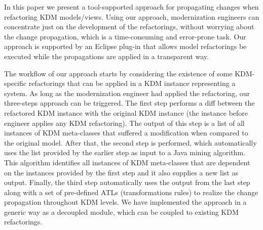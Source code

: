 In this paper we present a tool-supported approach for propagating changes when refactoring KDM models/views. Using our approach, modernization engineers can concentrate just on the development of the refactorings, without worrying about the change propagation, which is a time-consuming and error-prone task. Our approach is supported by an Eclipse plug-in that allows model refactorings be executed while the propagations are applied in a transparent way.


The workflow of our approach starts by considering the existence of some KDM-specific refactorings that can be applied in a KDM instance representing a system. As long as the modernization engineer had applied the refactoring, our three-steps approach can be triggered. The first step performs a diff between the refactored KDM instance with the original KDM instance (the instance before engineer applies any KDM refactoring). The output of this step is a list of all instances of KDM meta-classes that suffered a modification when compared to the original model. After that, the second step is performed, which automatically uses the list provided by the earlier step as input to a Java mining algorithm. This algorithm identifies all instances of KDM meta-classes that are dependent on the instances provided by the first step and it also supplies a new list as output.
%
%
%
Finally, the third step automatically uses the output from the last step along with a set of pre-defined ATLs (transformations rules) to realize the change propagation throughout KDM levels. We have implemented the approach in a generic way as a decoupled module, which can be coupled to existing KDM refactorings. 



